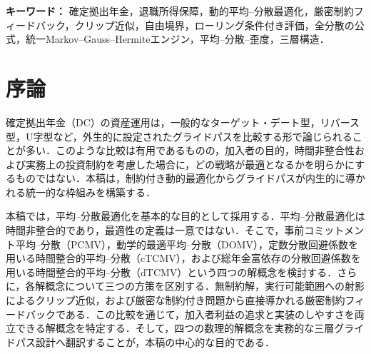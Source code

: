\documentclass[10pt,a4paper]{article}
\theoremstyle{plain}
\theoremstyle{definition}
\begin{document}
\begin{abstract}
\begin{sloppypar}
実務上は，cTCMVを標準デフォルト，DOMVを定期的見直し，dTCMVを総年金富に基づく個別化助言とする三層構造を提案する．PCMVはこれらの運用層には含めず，目標設定と平均--分散のトレードオフを整理する設計ベンチマークとして位置付ける．MVSは独立した第四層に置かず，係数較正，非凹性および数値安定性を追加検証すべき研究拡張として位置付ける．本稿の実務的貢献は，動的最適制御理論と実装可能なDCガバナンスを結び付ける点にある．外生的に設定されたグライドパスの形状を比較するのではなく，加入者利益の追求と実装のしやすさの双方に基づいて，グライドパスを導出，検証，比較し，各実務層へ割り当てる統一的な方法を提示する．数値計算では，共通の後退・前進体系により，方策形状，終端富分布，下方リスクおよび制約拘束を比較する．ローリング条件付き成果指標は，途中時点における低・中・高残高状態からの残存期間成果を同じ尺度で可視化し，各戦略の便益と費用を加入者状態別に説明可能にする．さらに，モーメント整合性，確率質量保存，格子安定性および四解概念の既存研究との結果比較を通じて，再現性を確保する．
\end{sloppypar}
\end{abstract}

{\footnotesize\sloppy\noindent\textbf{キーワード：} 確定拠出年金，退職所得保障，動的平均--分散最適化，厳密制約フィードバック，クリップ近似，自由境界，ローリング条件付き評価，全分散の公式，統一Markov--Gauss--Hermiteエンジン，平均--分散--歪度，三層構造．}

\newpage
\setcounter{tocdepth}{2}
{\footnotesize\tableofcontents}
\thispagestyle{plain}
\newpage

\section{序論}
\label{sec:introduction}

確定拠出年金（DC）の資産運用は，一般的なターゲット・デート型，リバース型，U字型など，外生的に設定されたグライドパスを比較する形で論じられることが多い．このような比較は有用であるものの，加入者の目的，時間非整合性および実務上の投資制約を考慮した場合に，どの戦略が最適となるかを明らかにするものではない．本稿は，制約付き動的最適化からグライドパスが内生的に導かれる統一的な枠組みを構築する．

本稿では，平均--分散最適化を基本的な目的として採用する．平均--分散最適化は時間非整合的であり，最適性の定義は一意ではない．そこで，事前コミットメント平均--分散（PCMV），動学的最適平均--分散（DOMV），定数分散回避係数を用いる時間整合的平均--分散（cTCMV），および総年金富依存の分散回避係数を用いる時間整合的平均--分散（dTCMV）という四つの解概念を検討する．さらに，各解概念について三つの方策を区別する．無制約解，実行可能範囲への射影によるクリップ近似，および厳密な制約付き問題から直接導かれる厳密制約フィードバックである．この比較を通じて，加入者利益の追求と実装のしやすさを両立できる解概念を特定する．そして，四つの数理的解概念を実務的な三層グライドパス設計へ翻訳することが，本稿の中心的な目的である．
\end{document}
